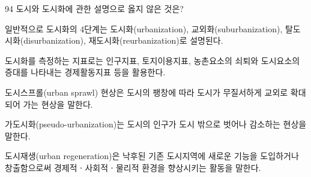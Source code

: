 \begin{question}{94}
도시와 도시화에 관한 설명으로 옳지 않은 것은?
\begin{choices}
  \item 일반적으로 도시화의 4단계는 도시화(urbanization), 교외화(suburbanization), 탈도시화(disurbanization), 재도시화(reurbanization)로 설명된다.
  \item 도시화를 측정하는 지표로는 인구지표, 토지이용지표, 농촌요소의 쇠퇴와 도시요소의 증대를 나타내는 경제활동지표 등을 활용한다.
  \item 도시스프롤(urban sprawl) 현상은 도시의 팽창에 따라 도시가 무질서하게 교외로 확대되어 가는 현상을 말한다.
  \item 가도시화(pseudo-urbanization)는 도시의 인구가 도시 밖으로 벗어나 감소하는 현상을 말한다.
  \item 도시재생(urban regeneration)은 낙후된 기존 도시지역에 새로운 기능을 도입하거나 창출함으로써 경제적ㆍ사회적ㆍ물리적 환경을 향상시키는 활동을 말한다.
\end{choices}
\end{question}
